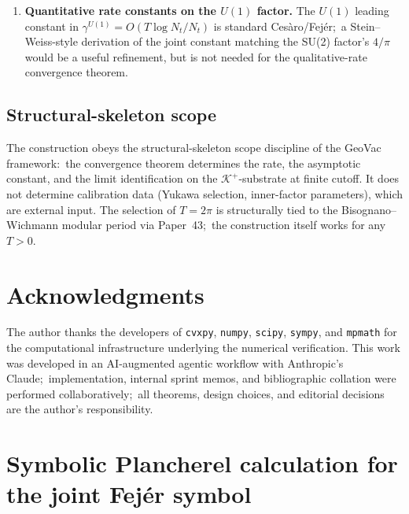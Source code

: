 \documentclass[11pt,a4paper]{article}
\theoremstyle{plain}
\theoremstyle{definition}
\newcommand{\Nt}{N_{t}}
\newcommand{\Krein}{\mathcal{K}}
\newcommand{\Uone}{U(1)}
\newcommand{\gammaU}{\gamma^{\Uone}}
\newcommand{\Kplus}{\Krein^{+}}
\begin{document}
\begin{enumerate}
\item[(Q5)] \textbf{Quantitative rate constants on the $\Uone$ factor.}
The $\Uone$ leading constant in $\gammaU = O(T\log\Nt/\Nt)$ is standard
Cesàro/Fej\'er;\ a Stein--Weiss-style derivation of the joint constant
matching the SU(2) factor's $4/\pi$ would be a useful refinement, but
is not needed for the qualitative-rate convergence theorem.
\end{enumerate}

\subsection{Structural-skeleton scope}\label{sec:scope_skeleton}

The construction obeys the structural-skeleton scope discipline of the
GeoVac framework:\ the convergence theorem determines the rate, the
asymptotic constant, and the limit identification on the
$\Kplus$-substrate at finite cutoff. It does not determine
calibration data (Yukawa selection, inner-factor parameters), which are
external input. The selection of $T = 2\pi$ is structurally tied to
the Bisognano--Wichmann modular period via Paper~43;\ the construction
itself works for any $T > 0$.

\section*{Acknowledgments}

The author thanks the developers of \texttt{cvxpy}, \texttt{numpy},
\texttt{scipy}, \texttt{sympy}, and \texttt{mpmath} for the
computational infrastructure underlying the numerical verification.
This work was developed in an AI-augmented agentic workflow with
Anthropic's Claude;\ implementation, internal sprint memos, and
bibliographic collation were performed collaboratively;\ all
theorems, design choices, and editorial decisions are the author's
responsibility.

\appendix
\section{Symbolic Plancherel calculation for the joint Fej\'er symbol}
\label{app:plancherel}
\end{document}
